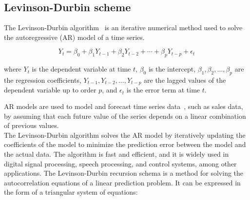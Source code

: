 \subsection{Levinson-Durbin scheme} \label{subsec:levinson}

The Levinson-Durbin algorithm~\cite{Levinson} is an iterative numerical method used to solve the autoregressive
(AR) model of a time series.

\begin{equation}
    \label{eq:levinson}
    Y_t = \beta_0 + \beta_1 Y_{t-1} + \beta_2 Y_{t-2} + \cdots + \beta_p Y_{t-p} + \epsilon_t
\end{equation}

where $Y_t$ is the dependent variable at time $t$, $\beta_0$ is the intercept, $\beta_1, \beta_2, \dots, \beta_p$ are the
regression coefficients, $Y_{t-1}, Y_{t-2}, \dots, Y_{t-p}$ are the lagged values of the dependent variable up to
order $p$, and $\epsilon_t$ is the error term at time $t$.

AR models are used to model and forecast time series data~\cite{Durbin}, such as sales data, by assuming that each
future value of the series depends on a linear combination of previous values.
\\
The Levinson-Durbin algorithm solves the AR model by iteratively updating the coefficients of the model to minimize
the prediction error between the model and the actual data. The algorithm is fast and efficient, and it is widely
used in digital signal processing, speech processing, and control systems, among other applications.
The Levinson-Durbin recursion schema is a method for solving the autocorrelation equations of a linear
prediction problem. It can be expressed in the form of a triangular system of equations:


